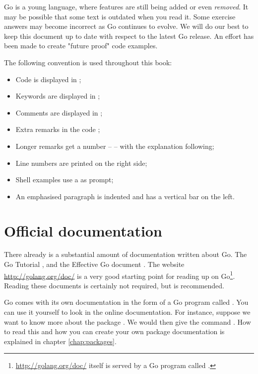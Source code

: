 Go is a young language, where 
features are still being added or even \emph{removed}. It 
may be possible that some text is outdated when you
read it. 
Some exercise answers may become incorrect as Go continues
to evolve.
We will do our best to keep this document up to 
date with respect to the latest Go release.
An effort has been made to create "future proof" code examples.

The following convention is used throughout this book:
\begin{itemize}
\item Code is displayed in ;
\item Keywords are displayed in ;
\item Comments are displayed in ;
\item Extra remarks in the code ;
\item Longer remarks get a number --  -- with the explanation following;
\item Line numbers are printed on the right side;
\item Shell examples use a \pr{} as prompt;
\item An emphasised paragraph is indented and has a vertical bar on the
left.
\end{itemize}

\section{Official documentation}
There already is a substantial amount of documentation written about Go.
The Go Tutorial \cite{go_tutorial}, and the Effective Go
document \cite{effective_go}. The
website \url{http://golang.org/doc/} is a very good starting point
for reading up on Go\footnote{\url{http://golang.org/doc/} itself is served by 
a Go program called .}. Reading these documents is
certainly not required, but is recommended.

Go comes with its own documentation in the form of a Go program called
. 
You can use it yourself to look
in the online documentation. For
instance, suppose we want to know more about the package .
We would then give the command .
How to read this and how you can create your own package documentation
is explained in chapter \ref{chap:packages}.

